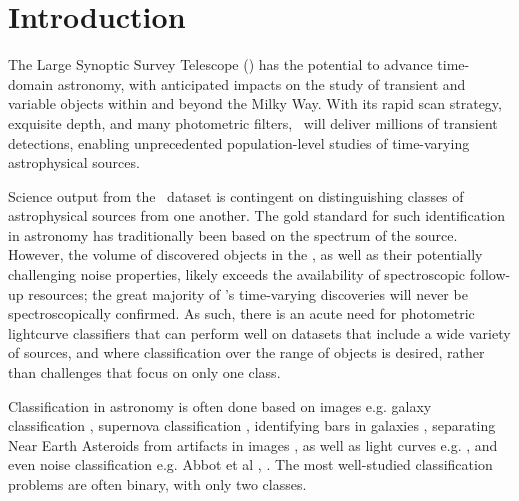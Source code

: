 \section{Introduction}
\label{sec:intro}

The Large Synoptic Survey Telescope (\lsst) has the potential to advance time-domain astronomy, with anticipated impacts on the study of transient and variable objects within and beyond the Milky Way.
With its rapid scan strategy, exquisite depth, and many photometric filters, \lsst\ will deliver millions of transient detections, enabling unprecedented population-level studies of time-varying astrophysical sources.

Science output from the \lsst\ dataset is contingent on distinguishing classes of astrophysical sources from one another.
The gold standard for such identification in astronomy has traditionally been based on the spectrum of the source.
However, the volume of discovered objects in the \lsst, as well as their potentially challenging noise properties, likely exceeds the availability of spectroscopic follow-up resources; the great majority of \lsst's time-varying discoveries will never be spectroscopically confirmed.
As such, there is an acute need for photometric lightcurve classifiers that can perform well on datasets that include a wide variety of sources, and where classification over the range of objects is desired, rather than challenges that focus on only one class.

Classification in astronomy is often done based on images e.g. galaxy classification \citep{2016A&C....16...34H}, supernova classification \citep{2017ApJ...836...97C}
, identifying bars in galaxies \citep{2018MNRAS.477..894A}, separating Near Earth Asteroids from artifacts in images \citep{2016PASJ...68..104M}, as well as light curves e.g. \citet{2016PASJ...68..104M, 2017arXiv170906257M, 2017CQGra..34f4003Z}, and even noise classification e.g. Abbot et al
, \citet{2017CQGra..34f4003Z, 2018PhRvD..97j1501G}.
The most well-studied classification problems are often binary, with only two classes.

